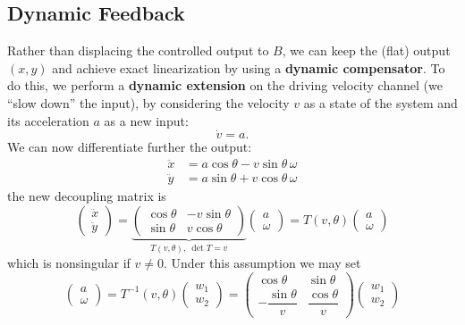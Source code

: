 \documentclass[10pt, a4paper]{report}
\begin{document}
\subsection{Dynamic Feedback}
Rather than displacing the controlled output to $B$, we can keep the (flat) output $(x,y)$ and achieve exact linearization by using a \textbf{dynamic compensator}. To do this, we perform a \textbf{dynamic extension} on the driving velocity channel (we ``slow down'' the input), by considering the velocity $v$ as a state of the system and its acceleration $a$ as a new input:\begin{equation}
    \dot v=a.
\end{equation}
We can now differentiate further the output:\begin{align}
    \ddot x&=a\cos\theta-v\sin\theta\,\omega\\
    \ddot y&=a\sin\theta+v\cos\theta\,\omega
\end{align}
the new decoupling matrix is\begin{equation}
    \begin{pmatrix}
        \ddot x\\ \ddot y
    \end{pmatrix}=\underbrace{\begin{pmatrix}
        \cos\theta&-v\sin\theta\\\sin\theta&v\cos\theta
    \end{pmatrix}}_{T(v,\theta),\ \det T=v}\begin{pmatrix}
        a\\ \omega
    \end{pmatrix}=T(v,\theta)\begin{pmatrix}
        a\\ \omega
    \end{pmatrix}
\end{equation}
which is nonsingular if $v\neq 0$. Under this assumption we may set\begin{equation}
    \begin{pmatrix}
        a\\ \omega
    \end{pmatrix}=T^{-1}(v,\theta)\begin{pmatrix}
        w_1\\ w_2
    \end{pmatrix}=\begin{pmatrix}
        \cos\theta&\sin\theta\\-\dfrac{\sin\theta}{v}&\dfrac{\cos\theta}{v}
    \end{pmatrix}\begin{pmatrix}
        w_1\\ w_2
    \end{pmatrix}
\end{equation}
\end{document}
